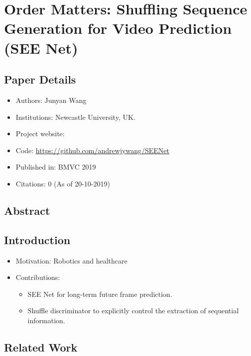 \documentclass{article}
\begin{document}
    \section{Order Matters: Shuffling Sequence Generation for Video Prediction (SEE Net)}\label{sec:Order_Matters_Shuffling_Sequence_Generation_for_Video_Prediction_(SEE_Net)}
    \subsection*{Paper Details}
    \begin{itemize}
        \item Authors: Junyan Wang
        \item Institutions: Newcastle University, UK\@.
        \item Project website:
        \item Code: \url{https://github.com/andrewjywang/SEENet}
        \item Published in: BMVC 2019
        \item Citations: 0 (As of 20-10-2019)
    \end{itemize}

    \subsection*{Abstract}

    \subsection{Introduction}\label{subsec:Order_Matters_Shuffling_Sequence_Generation_for_Video_Prediction_(SEE_Net):introduction}
    \begin{itemize}
        \item Motivation: Robotics and healthcare
        \item Contributions:
        \begin{itemize}
            \item SEE Net for long-term future frame prediction.
            \item Shuffle discriminator to explicitly control the extraction of sequential information.
        \end{itemize}
    \end{itemize}

    \subsection{Related Work}\label{subsec:Order_Matters_Shuffling_Sequence_Generation_for_Video_Prediction_(SEE_Net):related-work}
\end{document}
